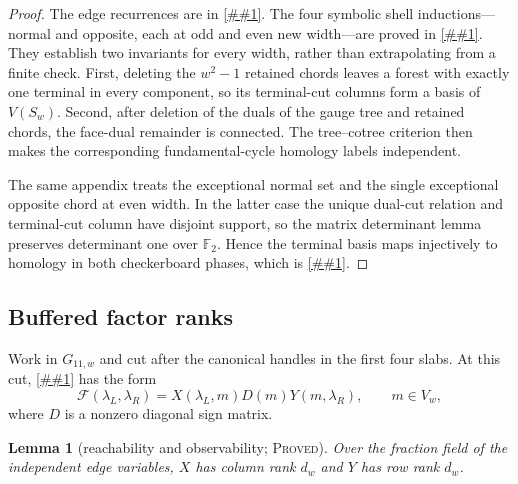 \documentclass[11pt]{article}
\newcommand{\cref}[1]{\autoref{##1}}%
\newtheorem{lemma}[theorem]{Lemma}
\newcommand{\Ftwo}{\mathbb F_2}
\newcommand{\cF}{\mathcal F}
\newcommand{\claimtag}[1]{\textsc{#1}}
\newcommand{\proved}{\claimtag{Proved}}
\begin{document}
\begin{proof}
The edge recurrences are in \cref{app:encoders}.  The four symbolic shell
inductions---normal and opposite, each at odd and even new width---are proved
in \cref{app:encoder-induction}.  They establish two invariants for every
width, rather than extrapolating from a finite check.  First, deleting the
\(w^2-1\) retained chords leaves a forest with exactly one terminal in every
component, so its terminal-cut columns form a basis of \(V(S_w)\).  Second,
after deletion of the duals of the gauge tree and retained chords, the
face-dual remainder is connected.  The tree--cotree criterion then makes the
corresponding fundamental-cycle homology labels independent.

The same appendix treats the exceptional normal set and the single
exceptional opposite chord at even width.  In the latter case the unique
dual-cut relation and terminal-cut column have disjoint support, so the
matrix determinant lemma preserves determinant one over \(\Ftwo\).  Hence
the terminal basis maps injectively to homology in both checkerboard phases,
which is \cref{eq:terminal-map}.
\end{proof}

\subsection{Buffered factor ranks}

Work in \(G_{11,w}\) and cut after the canonical handles in the first four
slabs.  At this cut, \cref{eq:XY} has the form
\begin{equation}\label{eq:XDY}
 \cF(\lambda_L,\lambda_R)=X(\lambda_L,m)D(m)Y(m,\lambda_R),
 \qquad m\in V_w,
\end{equation}
where \(D\) is a nonzero diagonal sign matrix.

\begin{lemma}[reachability and observability; \proved]\label{lem:XYfull}
Over the fraction field of the independent edge variables, \(X\) has column
rank \(d_w\) and \(Y\) has row rank \(d_w\).
\end{lemma}
\end{document}
